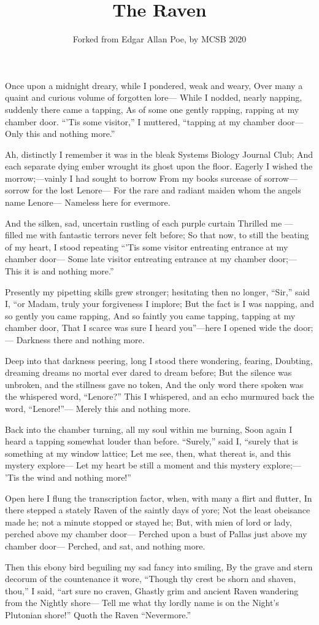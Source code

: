 \documentclass{article}
\title{The Raven}
\author{Forked from Edgar Allan Poe, by MCSB 2020}
\begin{document}
\maketitle

Once upon a midnight dreary, while I pondered, weak and weary, 
Over many a quaint and curious volume of forgotten lore—
While I nodded, nearly napping, suddenly there came a tapping,
As of some one gently rapping, rapping at my chamber door.
“’Tis some visitor,” I muttered, “tapping at my chamber door—
Only this and nothing more.”

Ah, distinctly I remember it was in the bleak Systems Biology Journal Club;
And each separate dying ember wrought its ghost upon the floor.
Eagerly I wished the morrow;—vainly I had sought to borrow
From my books surcease of sorrow—sorrow for the lost Lenore—
For the rare and radiant maiden whom the angels name Lenore—
Nameless here for evermore.

And the silken, sad, uncertain rustling of each purple curtain
Thrilled me — filled me with fantastic terrors never felt before;
So that now, to still the beating of my heart, I stood repeating
“’Tis some visitor entreating entrance at my chamber door—
Some late visitor entreating entrance at my chamber door;—
This it is and nothing more.”

Presently my pipetting skills grew stronger; hesitating then no longer,
“Sir,” said I, “or Madam, truly your forgiveness I implore;
But the fact is I was napping, and so gently you came rapping,
And so faintly you came tapping, tapping at my chamber door,
That I scarce was sure I heard you”—here I opened wide the door;—
Darkness there and nothing more.

Deep into that darkness peering, long I stood there wondering, fearing,
Doubting, dreaming dreams no mortal ever dared to dream before;
But the silence was unbroken, and the stillness gave no token,
And the only word there spoken was the whispered word, “Lenore?”
This I whispered, and an echo murmured back the word, “Lenore!”—
Merely this and nothing more.

Back into the chamber turning, all my soul within me burning,
Soon again I heard a tapping somewhat louder than before.
“Surely,” said I, “surely that is something at my window lattice;
Let me see, then, what thereat is, and this mystery explore—
Let my heart be still a moment and this mystery explore;—
’Tis the wind and nothing more!”

Open here I flung the transcription factor, when, with many a flirt and flutter,
In there stepped a stately Raven of the saintly days of yore;
Not the least obeisance made he; not a minute stopped or stayed he;
But, with mien of lord or lady, perched above my chamber door—
Perched upon a bust of Pallas just above my chamber door—
Perched, and sat, and nothing more.

Then this ebony bird beguiling my sad fancy into smiling,
By the grave and stern decorum of the countenance it wore,
“Though thy crest be shorn and shaven, thou,” I said, “art sure no craven,
Ghastly grim and ancient Raven wandering from the Nightly shore—
Tell me what thy lordly name is on the Night’s Plutonian shore!”
Quoth the Raven “Nevermore.”
\end{document}
